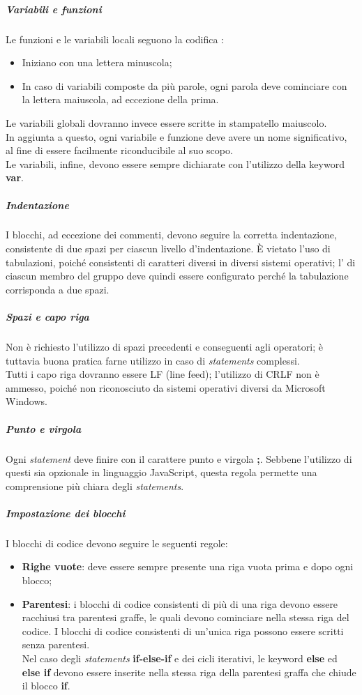 \documentclass[../norme-di-progetto.tex]{subfiles}
\begin{document}
\subparagraph*{Variabili e funzioni}
Le funzioni e le variabili locali seguono la codifica :
\begin{itemize}
  \item Iniziano con una lettera minuscola;
  \item In caso di variabili composte da più parole, ogni parola deve cominciare con la lettera maiuscola, ad eccezione della prima.
\end{itemize}
Le variabili globali dovranno invece essere scritte in stampatello maiuscolo. \\
In aggiunta a questo, ogni variabile e funzione deve avere un nome significativo, al fine di essere facilmente riconducibile al suo scopo. \\
Le variabili, infine, devono essere sempre dichiarate con l'utilizzo della keyword \textbf{var}.

\subparagraph*{Indentazione}
I blocchi, ad eccezione dei commenti, devono seguire la corretta indentazione, consistente di due spazi per ciascun livello d'indentazione. È vietato l'uso di tabulazioni, poiché consistenti di caratteri diversi in diversi sistemi operativi; l' di ciascun membro del gruppo deve quindi essere configurato perché la tabulazione corrisponda a due spazi.

\subparagraph*{Spazi e capo riga}
Non è richiesto l'utilizzo di spazi precedenti e conseguenti agli operatori; è tuttavia buona pratica farne utilizzo in caso di \textit{statements} complessi. \\
Tutti i capo riga dovranno essere LF (line feed); l'utilizzo di CRLF non è ammesso, poiché non riconosciuto da sistemi operativi diversi da Microsoft Windows.

\subparagraph*{Punto e virgola}
Ogni \textit{statement} deve finire con il carattere punto e virgola \textbf{;}. Sebbene l'utilizzo di questi sia opzionale in linguaggio JavaScript, questa regola permette una comprensione più chiara degli \textit{statements}.

\subparagraph*{Impostazione dei blocchi}
I blocchi di codice devono seguire le seguenti regole:
\begin{itemize}
  \item \textbf{Righe vuote}: deve essere sempre presente una riga vuota prima e dopo ogni blocco;
  \item \textbf{Parentesi}: i blocchi di codice consistenti di più di una riga devono essere racchiusi tra parentesi graffe, le quali devono cominciare nella stessa riga del codice. I blocchi di codice consistenti di un'unica riga possono essere scritti senza parentesi. \\ Nel caso degli \textit{statements} \textbf{if-else-if} e dei cicli iterativi, le keyword \textbf{else} ed \textbf{else if} devono essere inserite nella stessa riga della parentesi graffa che chiude il blocco \textbf{if}.
\end{itemize}

\newpage
\end{document}
